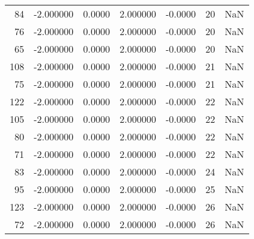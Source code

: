 \begin{tabular}{rrrrrrr}
 84 & -2.000000 &   0.0000 &  2.000000 &     -0.0000 &          20 & NaN \\
 76 & -2.000000 &   0.0000 &  2.000000 &     -0.0000 &          20 & NaN \\
 65 & -2.000000 &   0.0000 &  2.000000 &     -0.0000 &          20 & NaN \\
108 & -2.000000 &   0.0000 &  2.000000 &     -0.0000 &          21 & NaN \\
 75 & -2.000000 &   0.0000 &  2.000000 &     -0.0000 &          21 & NaN \\
122 & -2.000000 &   0.0000 &  2.000000 &     -0.0000 &          22 & NaN \\
105 & -2.000000 &   0.0000 &  2.000000 &     -0.0000 &          22 & NaN \\
 80 & -2.000000 &   0.0000 &  2.000000 &     -0.0000 &          22 & NaN \\
 71 & -2.000000 &   0.0000 &  2.000000 &     -0.0000 &          22 & NaN \\
 83 & -2.000000 &   0.0000 &  2.000000 &     -0.0000 &          24 & NaN \\
 95 & -2.000000 &   0.0000 &  2.000000 &     -0.0000 &          25 & NaN \\
123 & -2.000000 &   0.0000 &  2.000000 &     -0.0000 &          26 & NaN \\
 72 & -2.000000 &   0.0000 &  2.000000 &     -0.0000 &          26 & NaN \\
\bottomrule
\end{tabular}
